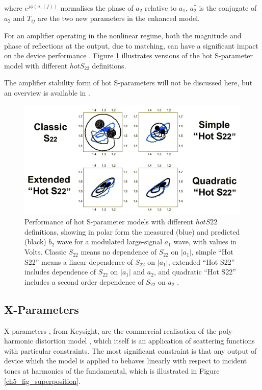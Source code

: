 \documentclass[../thesis/thesis.tex]{subfiles}
\begin{document}
where $e^{j\phi(a_1(f))}$ normalises the phase of $a_2$ relative to $a_1$, $a_2^*$ is the conjugate of $a_2$ and $T_{ij}$ are the two new parameters in the enhanced model.

For an amplifier operating in the nonlinear regime, both the magnitude and phase of reflections at the output, due to matching, can have a significant impact on the device performance \cite[Figure 12.13]{Cripps_2006}. Figure \ref{ch5_fig_hots22} illustrates versions of the hot S-parameter model with different $hotS_{22}$ definitions.

The amplifier stability form of hot S-parameters will not be discussed here, but an overview is available in \cite{Verspecht_2005}.

\begin{figure}
	\centering
	\includegraphics[width=\linewidth]{hots22_recoloured}
	\caption[Performance of hot S-parameter models with different $hotS22$ definitions.]{Performance of hot S-parameter models with different $hotS22$ definitions, showing in polar form the measured (blue) and predicted (black) $b_2$ wave for a modulated large-signal $a_1$ wave, with values in Volts. Classic $S_{22}$ means no dependence of $S_{22}$ on $|a_1|$, simple ``Hot S22'' means a linear dependence of $S_{22}$ on $|a_1|$, extended ``Hot S22'' includes dependence of $S_{22}$ on $|a_1|$ and $a_2$, and quadratic ``Hot S22'' includes a second order dependence of $S_{22}$ on $a_2$ \cite{Verspecht_2002}.}
	\label{ch5_fig_hots22}
\end{figure}

\subsection{X-Parameters}

X-parameters \cite{Root_2013}, from Keysight, are the commercial realisation of the poly-harmonic distortion model \cite{Verspecht_2006}, which itself is an application of scattering functions with particular constraints. The most significant constraint is that any output of device which the model is applied to behaves linearly with respect to incident tones at harmonics of the fundamental, which is illustrated in Figure \ref{ch5_fig_superposition}. 
\end{document}

